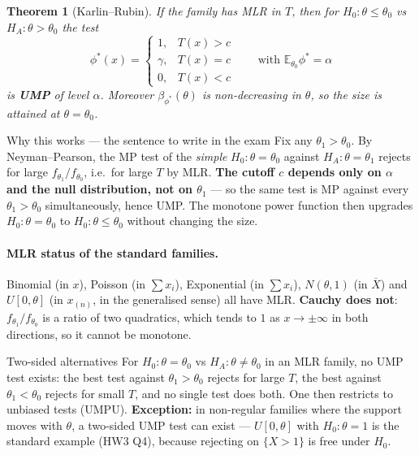 \documentclass[11pt]{article}
\newtheorem{theorem}{Theorem}[section]
\theoremstyle{remark}
\newcommand{\E}{\mathbb{E}}
\newcommand{\Xbar}{\overline{X}}
\begin{document}
\begin{theorem}[Karlin--Rubin]
If the family has MLR in $T$, then for $H_0:\theta\le\theta_0$ vs $H_A:\theta>\theta_0$ the test
\[
\phi^*(x)=\begin{cases}1,&T(x)>c\\ \gamma,&T(x)=c\\ 0,&T(x)<c\end{cases}
\qquad\text{with }\E_{\theta_0}\phi^*=\alpha
\]
is \textbf{UMP} of level $\alpha$. Moreover $\beta_{\phi^*}(\theta)$ is non-decreasing in
$\theta$, so the size is attained at $\theta=\theta_0$.
\end{theorem}

\begin{keybox}{Why this works --- the sentence to write in the exam}
Fix any $\theta_1>\theta_0$. By Neyman--Pearson, the MP test of the \emph{simple}
$H_0:\theta=\theta_0$ against $H_A:\theta=\theta_1$ rejects for large
$f_{\theta_1}/f_{\theta_0}$, i.e.\ for large $T$ by MLR. \textbf{The cutoff $c$ depends only on
$\alpha$ and the null distribution, not on $\theta_1$} --- so the same test is MP against every
$\theta_1>\theta_0$ simultaneously, hence UMP. The monotone power function then upgrades
$H_0:\theta=\theta_0$ to $H_0:\theta\le\theta_0$ without changing the size.
\end{keybox}

\paragraph{MLR status of the standard families.}
Binomial (in $x$), Poisson (in $\sum x_i$), Exponential (in $\sum x_i$), $N(\theta,1)$ (in
$\Xbar$) and $U[0,\theta]$ (in $x_{(n)}$, in the generalised sense) all have MLR.
\textbf{Cauchy does not}: $f_{\theta_1}/f_{\theta_0}$ is a ratio of two quadratics, which
tends to $1$ as $x\to\pm\infty$ in both directions, so it cannot be monotone.

\begin{warnbox}{Two-sided alternatives}
For $H_0:\theta=\theta_0$ vs $H_A:\theta\ne\theta_0$ in an MLR family, no UMP test exists:
the best test against $\theta_1>\theta_0$ rejects for large $T$, the best against
$\theta_1<\theta_0$ rejects for small $T$, and no single test does both. One then restricts to
unbiased tests (UMPU). \textbf{Exception:} in non-regular families where the support moves
with $\theta$, a two-sided UMP test can exist --- $U[0,\theta]$ with $H_0:\theta=1$ is the
standard example (HW3 Q4), because rejecting on $\{X>1\}$ is free under $H_0$.
\end{warnbox}
\end{document}
